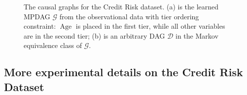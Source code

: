\documentclass{article} %
\begin{document}
\begin{figure}[ht]
{ }
\caption{The causal graphs for the Credit Risk dataset.
(a) is the learned MPDAG $\mathcal{G}$ from the observational data with tier ordering constraint: $\operatorname{Age}$ is placed in the first tier, while all other variables are in the second tier; (b) is an arbitrary DAG $\mathcal{D}$ in the Markov equivalence class of $\mathcal{G}$.}
\label{fig: causal_graph_credit}
\end{figure}


\subsection{More experimental details on the Credit Risk Dataset} \label{Appendix: Training Details on Credit Data}



\end{document}
